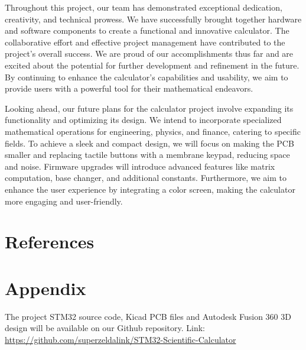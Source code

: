 \documentclass[a4paper, twoside]{report}
\begin{document}
Throughout this project, our team has demonstrated exceptional dedication, creativity, and technical prowess. We have successfully brought together hardware and software components to create a functional and innovative calculator. The collaborative effort and effective project management have contributed to the project's overall success. We are proud of our accomplishments thus far and are excited about the potential for further development and refinement in the future. By continuing to enhance the calculator's capabilities and usability, we aim to provide users with a powerful tool for their mathematical endeavors.

Looking ahead, our future plans for the calculator project involve expanding its functionality and optimizing its design. We intend to incorporate specialized mathematical operations for engineering, physics, and finance, catering to specific fields. To achieve a sleek and compact design, we will focus on making the PCB smaller and replacing tactile buttons with a membrane keypad, reducing space and noise. Firmware upgrades will introduce advanced features like matrix computation, base changer, and additional constants. Furthermore, we aim to enhance the user experience by integrating a color screen, making the calculator more engaging and user-friendly.

\setcounter{biburllcpenalty}{7000}
\setcounter{biburlucpenalty}{8000}

\chapter{References}
\nocite{*}
\begin{otherlanguage}{vietnamese}
\AtNextBibliography{\large}
\printbibliography[heading=none]
\end{otherlanguage}

\vspace{2cm}
{\let\clearpage\relax \chapter*{Appendix}}
The project STM32 source code, Kicad PCB files and Autodesk Fusion 360 3D design will be available on our Github repository. Link: \url{https://github.com/superzeldalink/STM32-Scientific-Calculator}
\end{document}
